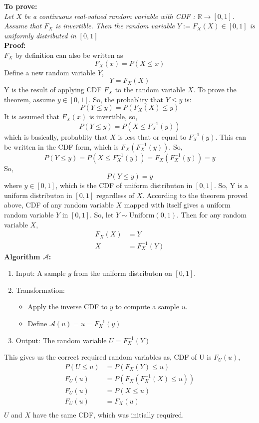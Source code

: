 \begin{solution}
		\textbf{To prove: }\\
		\emph{Let $X$ be a continuous real-valued random variable with CDF  : $\mathbb{R} \rightarrow [0, 1]$. Assume that
		$F_X$ is invertible. Then the random variable $Y := F_X (X) \in [0, 1]$ is uniformly distributed in $[0, 1]$}\\
		\textbf{Proof:}\\
		$F_X$ by definition can also be written as
		\[F_X(x) = P(X\leq x)\]
		Define a new random variable $Y$,
		\[Y =F_X(X) \]
		Y is the result of applying CDF $F_X$ to the random variable $X$.
		To prove the theorem, assume $y\in [0,1]$. So, the probablity that $Y \leq y$ is:
		\[P(Y\leq y) = P(F_X(X)\leq y)\]
		It is assumed that $F_X(x)$ is invertible, so,
		\[P(Y\leq y) = P(X\leq F_X^{-1}(y))\]
		which is basically, probablity that $X$ is less that or equal to $F_X^{-1}(y)$. This can be written in the CDF form, which is $F_X(F_X^{-1}(y))$. So,
		\[P(Y\leq y) = P(X\leq F_X^{-1}(y)) = F_X(F_X^{-1}(y)) = y\]
		So,
		\[P(Y\leq y) = y\]
		where $y\in [0,1]$, which is the CDF of uniform distributon in $[0,1]$.
	So, Y is a uniform distributon in $[0,1]$ regardless of $X$.
		According to the theorem proved above, CDF of any random variable $X$ mapped with itself gives a uniform
		random variable $Y$ in $[0,1]$. So, let $Y\sim \text{Uniform}(0,1)$. Then for any random variable $X$,
		\begin{align}
			F_X(X) & = Y \\
			X & = F_X^{-1}(Y)
		\end{align}
		\textbf{Algorithm $\mathcal{A}$:}
		\begin{enumerate}
			\item Input: A sample $y$ from the uniform distributon on $[0,1]$.
			\item Transformation:
			\begin{itemize}
				\item Apply the inverse CDF to $y$ to compute a sample $u$.
				\item Define $\mathcal{A}(u) = u = F_X^{-1}(y)$
			\end{itemize}
			\item Output: The random variable $U = F_X^{-1}(Y)$
		\end{enumerate}
		This gives us the correct required random variables as, CDF of U is $F_U(u)$,
		\begin{align}
			P(U\leq u ) & = P(F_X(Y) \leq u)\\
			F_U(u) & =  P(F_X(F_X^{-1}(X) \leq u))\\
			F_U(u) & =  P(X \leq u) \\
			F_U(u) & =  F_X(u) \\ 
		\end{align}
		$U$ and $X$ have the same CDF, which was initially required.
\end{solution}
